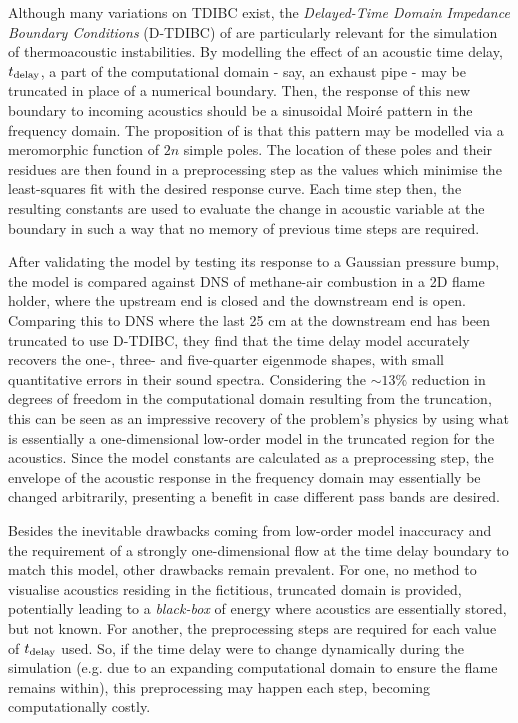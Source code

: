 Although many variations on TDIBC exist, the \emph{Delayed-Time Domain Impedance Boundary Conditions} (D-TDIBC) of \cite{douasbin2018DelayedtimeDomainImpedance} are particularly relevant for the simulation of thermoacoustic instabilities. By modelling the effect of an acoustic time delay, $t_{\rm{delay}}$, a part of the computational domain - say, an exhaust pipe - may be truncated in place of a numerical boundary. Then, the response of this new boundary to incoming acoustics should be a sinusoidal Moiré pattern in the frequency domain. The proposition of \cite{douasbin2018DelayedtimeDomainImpedance} is that this pattern may be modelled via a meromorphic function of $2n$ simple poles. The location of these poles and their residues are then found in a preprocessing step as the values which minimise the least-squares fit with the desired response curve. Each time step then, the resulting constants are used to evaluate the change in acoustic variable at the boundary in such a way that no memory of previous time steps are required. 

After validating the model by testing its response to a Gaussian pressure bump, the model is compared against DNS of methane-air combustion in a 2D flame holder, where the upstream end is closed and the downstream end is open. Comparing this to DNS where the last 25 cm at the downstream end has been truncated to use D-TDIBC, they find that the time delay model accurately recovers the one-, three- and five-quarter eigenmode shapes, with small quantitative errors in their sound spectra. Considering the $\sim 13\%$ reduction in degrees of freedom in the computational domain resulting from the truncation, this can be seen as an impressive recovery of the problem's physics by using what is essentially a one-dimensional low-order model in the truncated region for the acoustics. Since the model constants are calculated as a preprocessing step, the envelope of the acoustic response in the frequency domain may essentially be changed arbitrarily, presenting a benefit in case different pass bands are desired.

Besides the inevitable drawbacks coming from low-order model inaccuracy and the requirement of a strongly one-dimensional flow at the time delay boundary to match this model, other drawbacks remain prevalent. For one, no method to visualise acoustics residing in the fictitious, truncated domain is provided, potentially leading to a \emph{black-box} of energy where acoustics are essentially stored, but not known. For another, the preprocessing steps are required for each value of $t_{\rm{delay}}$ used. So, if the time delay were to change dynamically during the simulation (e.g. due to an expanding computational domain to ensure the flame remains within), this preprocessing may happen each step, becoming computationally costly.





